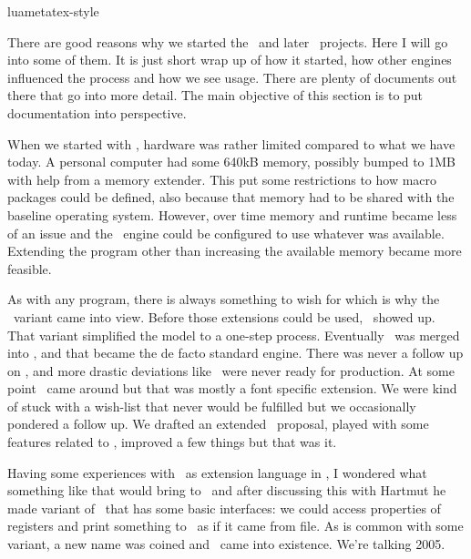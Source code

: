 
\environment luametatex-style

\startdocument[title=Engines]

\startsection[title={Introduction}]

There are good reasons why we started the \LUATEX\ and later \LUAMETATEX\
projects. Here I will go into some of them. It is just short wrap up of how it
started, how other engines influenced the process and how we see usage. There are
plenty of documents out there that go into more detail. The main objective of
this section is to put documentation into perspective.

\stopsection

\startsection[title={How it started}]

When we started with \CONTEXT, hardware was rather limited compared to what we
have today. A personal computer had some 640kB memory, possibly bumped to 1MB
with help from a memory extender. This put some restrictions to how macro
packages could be defined, also because that memory had to be shared with the
baseline operating system. However, over time memory and runtime became less of
an issue and the \TEX\ engine could be configured to use whatever was available.
Extending the program other than increasing the available memory became more
feasible.

As with any program, there is always something to wish for which is why the
\ETEX\ variant came into view. Before those extensions could be used, \PDFTEX\
showed up. That variant simplified the \quote {\TEX\ plus separate backend
driver} model to a one-step process. Eventually \ETEX\ was merged into \PDFTEX,
and that became the de facto standard engine. There was never a follow up on
\ETEX, and more drastic deviations like \OMEGA\ were never ready for production.
At some point \XETEX\ came around but that was mostly a font specific extension.
We were kind of stuck with a wish-list that never would be fulfilled but we
occasionally pondered a follow up. We drafted an extended \ETEX\ proposal, played
with some features related to \PDF, improved a few things but that was it.

Having some experiences with \LUA\ as extension language in \SCITE, I wondered
what something like that would bring to \TEX\ and after discussing this with
Hartmut he made variant of \PDFTEX\ that has some basic interfaces: we could
access properties of registers and print something to \TEX\ as if it came from
file. As is common with some variant, a new name was coined and \LUATEX\ came
into existence. We're talking 2005.

